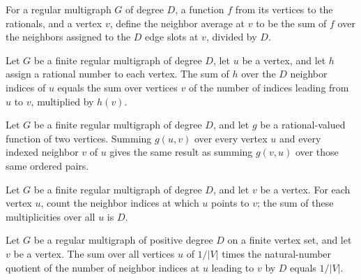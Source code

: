 \begin{definition}
\label{Randomized.RegularMultigraph.avg}
\leanok
For a regular multigraph $G$ of degree $D$, a function $f$ from its vertices to the
rationals, and a vertex $v$, define the neighbor average at $v$ to be the sum of $f$
over the neighbors assigned to the $D$ edge slots at $v$, divided by $D$.
\end{definition}

\begin{theorem}
\label{Randomized.RegularMultigraph.sum_nbr_eq}
\leanok
{}
Let $G$ be a finite regular multigraph of degree $D$, let $u$ be a vertex, and let $h$
assign a rational number to each vertex. The sum of $h$ over the $D$ neighbor indices of
$u$ equals the sum over vertices $v$ of the number of indices leading from $u$ to $v$,
multiplied by $h(v)$.
\end{theorem}

\begin{theorem}
\label{Randomized.RegularMultigraph.sum_swap}
\leanok
{}
Let $G$ be a finite regular multigraph of degree $D$, and let $g$ be a rational-valued
function of two vertices. Summing $g(u,v)$ over every vertex $u$ and every indexed
neighbor $v$ of $u$ gives the same result as summing $g(v,u)$ over those same ordered
pairs.
\end{theorem}

\begin{theorem}
\label{Randomized.RegularMultigraph.sum_mult_left}
\leanok
{}
Let $G$ be a finite regular multigraph of degree $D$, and let $v$ be a vertex. For each
vertex $u$, count the neighbor indices at which $u$ points to $v$; the sum of these
multiplicities over all $u$ is $D$.
\end{theorem}

\begin{theorem}
\label{Randomized.RegularMultigraph.uniform_stationary}
\leanok
{}
Let $G$ be a regular multigraph of positive degree $D$ on a finite vertex set, and let
$v$ be a vertex. The sum over all vertices $u$ of $1/|V|$ times the natural-number
quotient of the number of neighbor indices at $u$ leading to $v$ by $D$ equals $1/|V|$.
\end{theorem}

